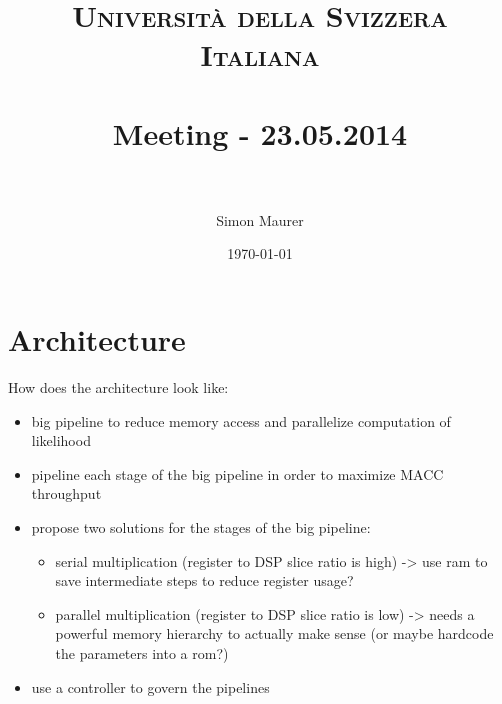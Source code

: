 \documentclass[paper=a4, fontsize=11pt]{scrartcl} %
\title{ 
\normalfont \normalsize 
\textsc{Università della Svizzera Italiana} \\ [25pt] %
\horrule{0.5pt} \\[0.4cm] %
\huge Meeting - 23.05.2014 \\ %
\horrule{2pt} \\[0.5cm] %
}
\author{Simon Maurer} %
\date{\normalsize\today} %
\begin{document}
\maketitle %


\section{Architecture}
How does the architecture look like:
\begin{itemize}
    \item big pipeline to reduce memory access and parallelize computation of likelihood
    \item pipeline each stage of the big pipeline in order to maximize MACC throughput
    \item propose two solutions for the stages of the big pipeline:
    \begin{itemize}
        \item serial multiplication (register to DSP slice ratio is high) -> use ram to
            save intermediate steps to reduce register usage?
        \item parallel multiplication (register to DSP slice ratio is low) -> needs a
            powerful memory hierarchy to actually make sense (or maybe hardcode the
            parameters into a rom?)
    \end{itemize}
    \item use a controller to govern the pipelines
\end{itemize}
\end{document}
